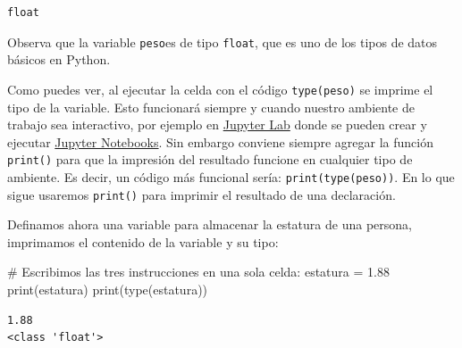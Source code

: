 \documentclass[
  spanish,
  letterpaper,
]{scrbook}
\newenvironment{Shaded}{\begin{snugshade}}{\end{snugshade}}
\newcommand{\BuiltInTok}[1]{\textcolor[rgb]{0.00,0.23,0.31}{#1}}
\newcommand{\CommentTok}[1]{\textcolor[rgb]{0.37,0.37,0.37}{#1}}
\newcommand{\FloatTok}[1]{\textcolor[rgb]{0.68,0.00,0.00}{#1}}
\newcommand{\NormalTok}[1]{\textcolor[rgb]{0.00,0.23,0.31}{#1}}
\newcommand{\OperatorTok}[1]{\textcolor[rgb]{0.37,0.37,0.37}{#1}}
\theoremstyle{definition}
\theoremstyle{remark}
\newcounter{quartocallouttipno}
\newcommand{\quartocallouttip}[1]{\refstepcounter{quartocallouttipno}\label{#1}}
\begin{document}
\begin{verbatim}
float
\end{verbatim}

Observa que la variable \texttt{peso}es de tipo \texttt{float}, que es
uno de los tipos de datos básicos en Python.

\begin{tcolorbox}[enhanced jigsaw, colframe=quarto-callout-tip-color-frame, opacityback=0, toprule=.15mm, colback=white, coltitle=black, leftrule=.75mm, arc=.35mm, breakable, left=2mm, bottomtitle=1mm, rightrule=.15mm, bottomrule=.15mm, colbacktitle=quarto-callout-tip-color!10!white, toptitle=1mm, titlerule=0mm, opacitybacktitle=0.6, title=\textcolor{quarto-callout-tip-color}{\faLightbulb}\hspace{0.5em}{Tip \ref*{tip-l1-print_type}}]

\quartocallouttip{tip-l1-print_type} 

Como puedes ver, al ejecutar la celda con el código \texttt{type(peso)}
se imprime el tipo de la variable. Esto funcionará siempre y cuando
nuestro ambiente de trabajo sea interactivo, por ejemplo en
\href{https://jupyterlab.readthedocs.io/en/latest/}{Jupyter Lab} donde
se pueden crear y ejecutar
\href{https://jupyterlab.readthedocs.io/en/4.4.x/user/notebook.html}{Jupyter
Notebooks}. Sin embargo conviene siempre agregar la función
\texttt{print()} para que la impresión del resultado funcione en
cualquier tipo de ambiente. Es decir, un código más funcional sería:
\texttt{print(type(peso))}. En lo que sigue usaremos \texttt{print()}
para imprimir el resultado de una declaración.

\end{tcolorbox}

Definamos ahora una variable para almacenar la estatura de una persona,
imprimamos el contenido de la variable y su tipo:

\begin{Shaded}
\begin{Highlighting}[]
\CommentTok{\# Escribimos las tres instrucciones en una sola celda:}
\NormalTok{estatura }\OperatorTok{=} \FloatTok{1.88}
\BuiltInTok{print}\NormalTok{(estatura)}
\BuiltInTok{print}\NormalTok{(}\BuiltInTok{type}\NormalTok{(estatura))}
\end{Highlighting}
\end{Shaded}

\begin{verbatim}
1.88
<class 'float'>
\end{verbatim}
\end{document}
